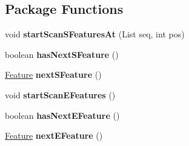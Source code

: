 \subsection*{Package Functions}
\begin{DoxyCompactItemize}
\item 
\hypertarget{classcrf_1_1tagger_1_1FeatureGen_ab34e50306c8dbd7d8e5086943fa131a1}{
void {\bfseries startScanSFeaturesAt} (List seq, int pos)}
\label{classcrf_1_1tagger_1_1FeatureGen_ab34e50306c8dbd7d8e5086943fa131a1}

\item 
\hypertarget{classcrf_1_1tagger_1_1FeatureGen_ae30dfdfae984edb88caddc9355ceac88}{
boolean {\bfseries hasNextSFeature} ()}
\label{classcrf_1_1tagger_1_1FeatureGen_ae30dfdfae984edb88caddc9355ceac88}

\item 
\hypertarget{classcrf_1_1tagger_1_1FeatureGen_a747583130d410a3683fd16924c1dbc31}{
\hyperlink{classcrf_1_1tagger_1_1Feature}{Feature} {\bfseries nextSFeature} ()}
\label{classcrf_1_1tagger_1_1FeatureGen_a747583130d410a3683fd16924c1dbc31}

\item 
\hypertarget{classcrf_1_1tagger_1_1FeatureGen_a3014b96f33b1c8d076320fed79aa21b3}{
void {\bfseries startScanEFeatures} ()}
\label{classcrf_1_1tagger_1_1FeatureGen_a3014b96f33b1c8d076320fed79aa21b3}

\item 
\hypertarget{classcrf_1_1tagger_1_1FeatureGen_a3d24e84ed34a30875b26ecca4cac6c57}{
boolean {\bfseries hasNextEFeature} ()}
\label{classcrf_1_1tagger_1_1FeatureGen_a3d24e84ed34a30875b26ecca4cac6c57}

\item 
\hypertarget{classcrf_1_1tagger_1_1FeatureGen_ad3f359593345feb0d042c092bbb0de32}{
\hyperlink{classcrf_1_1tagger_1_1Feature}{Feature} {\bfseries nextEFeature} ()}
\label{classcrf_1_1tagger_1_1FeatureGen_ad3f359593345feb0d042c092bbb0de32}

\end{DoxyCompactItemize}
